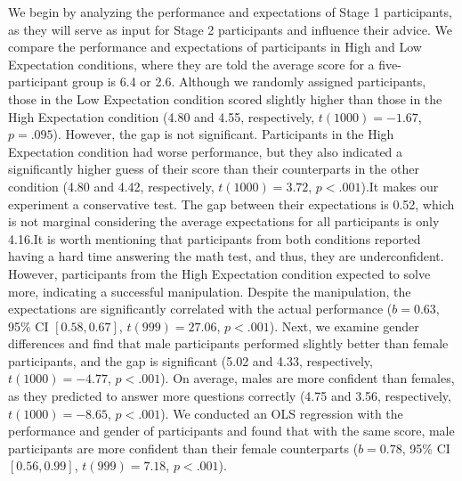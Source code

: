 \documentclass[
  man,floatsintext]{apa6}
\begin{document}
We begin by analyzing the performance and expectations of Stage 1 participants, as they will serve as input for Stage 2 participants and influence their advice. We compare the performance and expectations of participants in High and Low Expectation conditions, where they are told the average score for a five-participant group is 6.4 or 2.6. Although we randomly assigned participants, those in the Low Expectation condition scored slightly higher than those in the High Expectation condition (4.80 and 4.55, respectively, \(t(1000) = -1.67\), \(p = .095\)). However, the gap is not significant. Participants in the High Expectation condition had worse performance, but they also indicated a significantly higher guess of their score than their counterparts in the other condition (4.80 and 4.42, respectively, \(t(1000) = 3.72\), \(p < .001\)).It makes our experiment a conservative test. The gap between their expectations is 0.52, which is not marginal considering the average expectations for all participants is only 4.16.It is worth mentioning that participants from both conditions reported having a hard time answering the math test, and thus, they are underconfident. However, participants from the High Expectation condition expected to solve more, indicating a successful manipulation. Despite the manipulation, the expectations are significantly correlated with the actual performance (\(b = 0.63\), 95\% CI \([0.58, 0.67]\), \(t(999) = 27.06\), \(p < .001\)).
Next, we examine gender differences and find that male participants performed slightly better than female participants, and the gap is significant (5.02 and 4.33, respectively, \(t(1000) = -4.77\), \(p < .001\)). On average, males are more confident than females, as they predicted to answer more questions correctly (4.75 and 3.56, respectively, \(t(1000) = -8.65\), \(p < .001\)). We conducted an OLS regression with the performance and gender of participants and found that with the same score, male participants are more confident than their female counterparts (\(b = 0.78\), 95\% CI \([0.56, 0.99]\), \(t(999) = 7.18\), \(p < .001\)).
\end{document}
